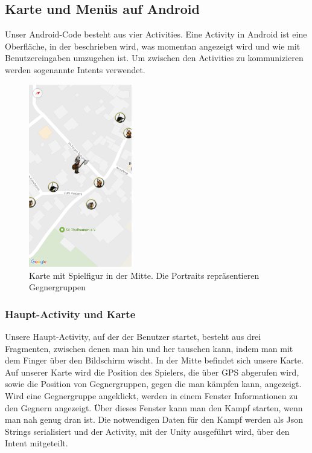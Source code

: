 \documentclass[extern,palatino]{cgBA}
\begin{document}
\subsection{Karte und Menüs auf Android}
Unser Android-Code besteht aus vier Activities. Eine Activity in Android ist eine Oberfläche, in der beschrieben wird, was momentan angezeigt wird und wie mit Benutzereingaben umzugehen ist. Um zwischen den Activities zu kommunizieren werden sogenannte Intents verwendet. 
\begin{figure}[htb] 
	\centering
	\includegraphics[width=0.4\textwidth]{map.png}
	\caption{Karte mit Spielfigur in der Mitte. Die Portraits repräsentieren
		Gegnergruppen}
	\label{fig:Bild1}
\end{figure}
\subsubsection{Haupt-Activity und Karte}Unsere Haupt-Activity, auf der der Benutzer startet, besteht aus drei Fragmenten, zwischen denen man hin und her tauschen kann, indem man mit dem Finger über den Bildschirm wischt. In der Mitte befindet sich unsere Karte. Auf unserer Karte wird die Position des Spielers, die über GPS abgerufen wird, sowie die Position von Gegnergruppen, gegen die man kämpfen kann, angezeigt. Wird eine Gegnergruppe angeklickt, werden in einem Fenster Informationen zu den Gegnern angezeigt. Über dieses Fenster kann man den Kampf starten, wenn man nah genug dran ist. Die notwendigen Daten für den Kampf werden als Json Strings serialisiert und der Activity, mit der Unity ausgeführt wird, über den Intent mitgeteilt.
\end{document}
